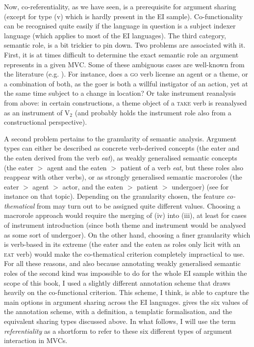 Now, co-referentiality, as we have seen, is a prerequisite for argument sharing (except for type (v) which is hardly present in the EI sample). Co-functionality can be recognised quite easily if the language in question is a subject indexer language (which applies to most of the EI languages). The third category, semantic role, is a bit trickier to pin down. Two problems are associated with it. First, it is at times difficult to determine the exact semantic role an argument represents in a given MVC. Some of these ambiguous cases are well-known from the literature (e.g. \citealt{Dowty1979, Jackendoff1990, van1997syntax}). For instance, does a \textsc{go} verb license an agent or a theme, or a combination of both, as the goer is both a willful instigator of an action, yet at the same time subject to a change in location? Or take instrument reanalysis from above: in certain constructions, a theme object of a \textsc{take} verb is reanalysed as an instrument of V$_2$ (and probably holds the instrument role also from a constructional perspective). 

A second problem pertains to the granularity of semantic analysis. Argument types can either be described as concrete verb-derived concepts (the eater and the eaten derived from the verb \textit{eat}), as weakly generalised semantic concepts (the eater $>$ agent and the eaten $>$ patient of a verb \textit{eat}, but these roles also reappear with other verbs), or as strongly generalised semantic macroroles (the eater $>$ agent $>$ actor, and the eaten $>$ patient $>$ undergoer) (see for instance \citealt{van1997syntax} on that topic). Depending on the granularity chosen, the feature \textit{co-thematical} from  may turn out to be assigned quite different values. Choosing a macrorole approach would require the merging of (iv) into (iii), at least for cases of instrument introduction (since both theme and instrument would be analysed as some sort of undergoer). On the other hand, choosing a finer granularity which is verb-based in its extreme (the eater and the eaten as roles only licit with an \textsc{eat} verb) would make the co-thematical criterion completely impractical to use. For all these reasons, and also because annotating weakly generalised semantic roles of the second kind was impossible to do for the whole EI sample within the scope of this book, I used a slightly different annotation scheme that draws heavily on the co-functional criterion. This scheme, I think, is able to capture the main options in argument sharing across the EI languages.  gives the six values of the annotation scheme, with a definition, a templatic formalisation, and the equivalent sharing types discussed above. In what follows, I will use the term \textit{referentiality} as a shortform to refer to these six different types of argument interaction in MVCs.

